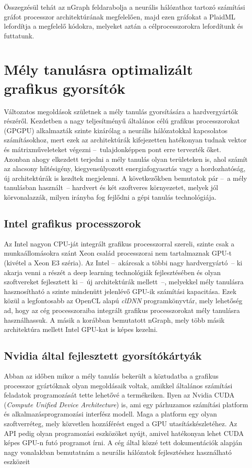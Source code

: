 Összegzésül tehát az nGraph feldarabolja a neurális hálózathoz tartozó számítási gráfot processzor architektúrának megfelelően, majd ezen gráfokat a PlaidML lefordítja a megfelelő kódokra, melyeket aztán a célprocesszorokra lefordítunk és futtatunk.

\section{Mély tanulásra optimalizált grafikus gyorsítók}
Változatos megoldások születnek a mély tanulás gyorsítására a hardvergyártók részéről. Kezdetben a nagy teljesítményű általános célú grafikus processzorokat (GPGPU) alkalmazták szinte kizárólag a neurális hálózatokkal kapcsolatos számításokhoz, mert ezek az architektúrák kifejezetten hatékonyan tudnak vektor és mátrixműveleteket végezni --~tulajdonképpen pont erre tervezték őket. Azonban ahogy elkezdett terjedni a mély tanulás olyan területeken is, ahol számít az alacsony hűtésigény, kiegyensúlyozott energiafogyasztás vagy a hordozhatóság, új architektúrák is kezdtek megjelenni. A következőkben bemutatok pár --~a mély tanulásban használt~-- hardvert és két szoftveres környezetet, melyek jól körvonalazzák, milyen irányba fog fejlődni a gépi tanulás technológiája.

\subsection{Intel grafikus processzorok}
Az Intel nagyon CPU-ját integrált grafikus processzorral szereli, szinte csak a munkaállomásokra szánt Xeon család processzorai nem tartalmaznak GPU-t (kivétel a Xeon E3 széria).\cite{wiki:listOfIGPU} Az Intel --~akárcsak a többi nagy hardvergyártó~-- ki akarja venni a részét a deep learning technológiák  fejlesztésében és olyan szoftvereket fejlesztett ki --~új architektúrák mellett~--, melyekkel mély tanulásra hasznosítható a szinte mindenütt jelenlévő GPU-ik számítási kapacitása. Ezek közül a legfontosabb az OpenCL alapú \emph{clDNN} programkönyvtár, mely lehetőség ad, hogy az cég processzoraiba integrált grafikus processzorokat mély tanulásra használhassuk. A másik a korábban bemutatott nGraph, mely több másik architektúra mellett Intel GPU-kat is képes kezelni.

\subsection{Nvidia által fejlesztett gyorsítókártyák}
Abban az időben mikor a mély tanulás bekerült a köztudatba a grafikus processzor gyártóknak olyan megoldásaik voltak, amikkel általános számítási feladatok programozását tette lehetővé a termékeiken. Ilyen az Nvidia CUDA (\emph{Compute Unified Device Architecture}) is, ami egy párhuzamos számítási platform és alkalmazásprogramozási interfész modell. Maga a platform egy olyan szoftverréteg, mely közvetlen hozzáférést enged a GPU utasításkészletéhez.\cite{wiki:cuda} Az API pedig olyan programozási eszközöket nyújt, amivel hatékonyan lehet CUDA képes GPU-n futó programot írni. A cég által közzé tett dokumentációk alapján nagy vonalakban bemutatnám a neurális hálózatok fejlesztéshez használható eszközeit\cite{web:cudnn}

